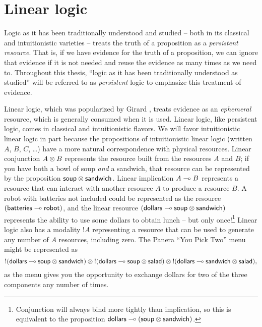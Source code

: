 
\chapter{Linear logic}

Logic as it has been traditionally understood and studied -- both in
its classical and intuitionistic varieties -- treats the truth of a
proposition as a {\it persistent resource}. That is, if we have
evidence for the truth of a proposition, we can ignore that evidence
if it is not needed and reuse the evidence as many times as we need
to. Throughout this thesis, ``logic as it has been traditionally
understood as studied'' will be referred to as {\it persistent} logic
to emphasize this treatment of evidence. 

Linear logic, which was popularized by Girard \cite{girard87linear},
treats evidence as an {\it ephemeral} resource, which is generally
consumed when it is used. Linear logic, like persistent logic, comes
in classical and intuitionistic flavors. We will favor intuitionistic
linear logic in part because the propositions of intuitionistic linear
logic (written $A$, $B$, $C$, \ldots) have a more natural
correspondence with physical resources. Linear conjunction $A \otimes
B$ represents the resource built from the resources $A$ and $B$; if
you have both a bowl of soup {\it and} a sandwich, that resource can
be represented by the proposition ${\sf soup} \otimes {\sf
  sandwich}$. Linear implication $A \multimap B$ represents a resource
that can interact with another resource $A$ to produce a resource
$B$. A robot with batteries not included could be represented as the
resource $({\sf batteries} \multimap {\sf robot})$, and the linear resource
$({\sf dollars} \multimap {\sf soup} \otimes {\sf sandwich})$ represents
the ability to use some dollars to obtain lunch -- but only
once!\footnote{Conjunction will always bind more tightly than
  implication, so this is equivalent to the proposition ${\sf dollars}
  \multimap ({\sf soup} \otimes {\sf sandwich})$.} Linear logic also has
a modality ${!}A$ representing a resource that can be used to generate
any number of $A$ resources, including zero. The Panera ``You Pick
Two'' menu might be represented as
\[ {!}({\sf dollars} \multimap {\sf soup} \otimes {\sf sandwich}) \otimes
{!}({\sf dollars} \multimap {\sf soup} \otimes {\sf salad}) \otimes
{!}({\sf dollars} \multimap {\sf sandwich} \otimes {\sf salad}),\] as the
menu gives you the opportunity to exchange dollars for two of the three
components any number of times.



